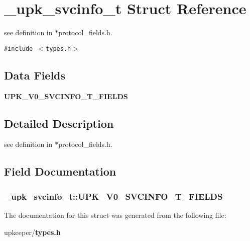 \section{\_\-upk\_\-svcinfo\_\-t Struct Reference}
\label{struct__upk__svcinfo__t}
see definition in $\ast$protocol\_\-fields.h.  


{\tt \#include $<$types.h$>$}

\subsection*{Data Fields}
\begin{CompactItemize}
\item 
\bf{UPK\_\-V0\_\-SVCINFO\_\-T\_\-FIELDS}
\end{CompactItemize}


\subsection{Detailed Description}
see definition in $\ast$protocol\_\-fields.h. 



\subsection{Field Documentation}
\subsubsection{\setlength{\rightskip}{0pt plus 5cm}\bf{\_\-upk\_\-svcinfo\_\-t::UPK\_\-V0\_\-SVCINFO\_\-T\_\-FIELDS}}\label{struct__upk__svcinfo__t_c6d1424c53cf3b182ff65eceb815e72e}




The documentation for this struct was generated from the following file:\begin{CompactItemize}
\item 
upkeeper/\bf{types.h}\end{CompactItemize}
